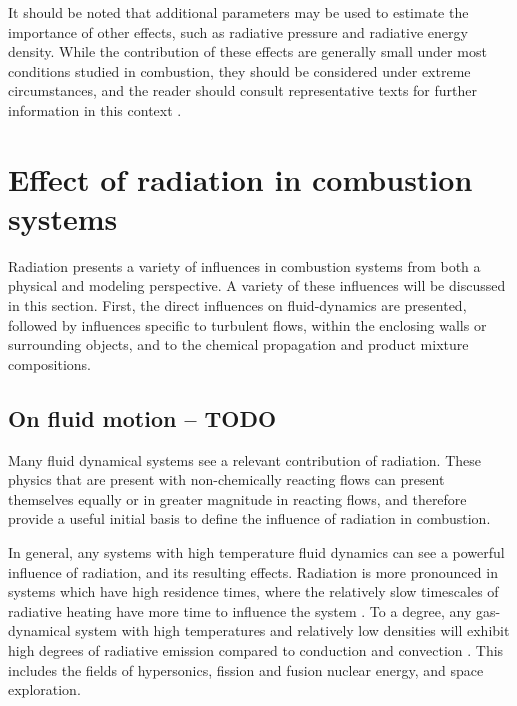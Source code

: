 It should be noted that additional parameters may be used to estimate the importance of other effects, such as radiative pressure and radiative energy density.
While the contribution of these effects are generally small under most conditions studied in combustion, they should be considered under extreme circumstances, and the reader should consult representative texts for further information in this context \cite{Pai1966RadiationDynamics}.


\section{Effect of radiation in combustion systems}
Radiation presents a variety of influences in combustion systems from both a physical and modeling perspective. A variety of these influences will be discussed in this section. First, the direct influences on fluid-dynamics are presented, followed by influences specific to turbulent flows, within the enclosing walls or surrounding objects, and to the chemical propagation and product mixture compositions.

\subsection{On fluid motion – TODO}
Many fluid dynamical systems see a relevant contribution of radiation. These physics that are present with non-chemically reacting flows can present themselves equally or in greater magnitude in reacting flows, and therefore provide a useful initial basis to define the influence of radiation in combustion. 

In general, any systems with high temperature fluid dynamics can see a powerful influence of radiation, and its resulting effects. 
Radiation is more pronounced in systems which have high residence times, where the relatively slow timescales of radiative heating have more time to influence the system \cite{Wu2021LimitationsFires}. 
To a degree, any gas-dynamical system with high temperatures and relatively low densities will exhibit high degrees of radiative emission compared to conduction and convection \cite{Pai1966RadiationDynamics}. This includes the fields of hypersonics, fission and fusion nuclear energy, and space exploration.

